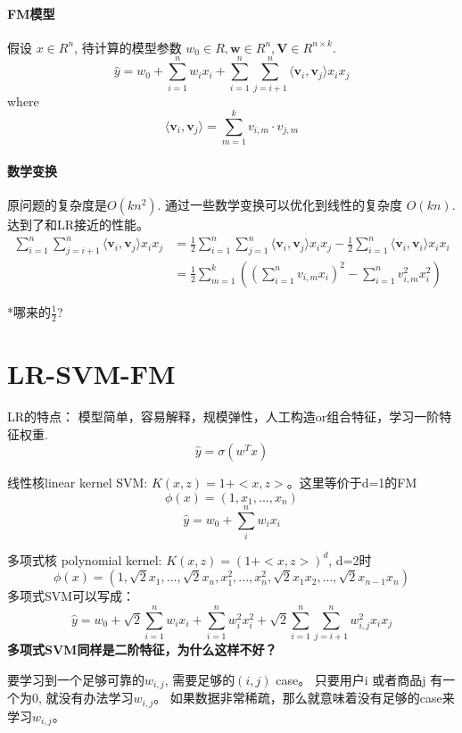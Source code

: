 \documentclass{article}
\begin{document}
\begin{CJK*}{UTF8}{gbsn}
\paragraph{FM模型} 假设 $x \in R^{n}$, 待计算的模型参数 $ w_{0} \in R, \textbf{w} \in R^{n}, \textbf{V} \in R^{n \times k}$.
$$\widehat{y}= w_{0}+\sum_{i=1}^{n}w_{i}x_{i}+\sum_{i=1}^{n}\sum_{j=i+1}^{n}\langle \textbf{v}_{i} ,\textbf{v}_{j} \rangle x_{i}x_{j}$$
where 
$$\langle \textbf{v}_{i} ,\textbf{v}_{j} \rangle =\sum_{m=1}^{k}v_{i,m} \cdot v_{j,m}$$

\paragraph{数学变换} 原问题的复杂度是$O(kn^{2})$. 通过一些数学变换可以优化到线性的复杂度 $O(kn)$. 达到了和LR接近的性能。
\begin{align*}
\sum_{i=1}^{n}\sum_{j=i+1}^{n}\langle \textbf{v}_{i} ,\textbf{v}_{j} \rangle x_{i}x_{j}
&= \frac{1}{2} \sum_{i=1}^{n}\sum_{j=1}^{n}\langle \textbf{v}_{i} ,\textbf{v}_{j} \rangle x_{i}x_{j} -\frac{1}{2}\sum_{i=1}^{n}\langle \textbf{v}_{i} ,\textbf{v}_{i} \rangle x_{i}x_{i} \\
&= \frac{1}{2}\sum_{m=1}^{k}\left( \left(\sum_{i=1}^{n}v_{i,m}x_{i}\right)^{2} -\sum_{i=1}^{n}v_{i,m}^{2}x_{i}^{2} \right)
\end{align*}

*哪来的$\frac{1}{2}$?

\section{LR-SVM-FM}
LR的特点： 模型简单，容易解释，规模弹性，人工构造or组合特征，学习一阶特征权重.
$$\widehat{y}=\sigma(w^{T}x)$$

线性核linear kernel SVM: $K(x,z)=1+<x,z>$。这里等价于d=1的FM
$$\phi(x)=(1,x_{1},...,x_{n})$$
$$\widehat{y}=w_{0}+\sum_{i}^{n}w_{i}x_{i}$$

多项式核 polynomial kernel: $K(x,z)=(1+<x,z>)^{d}$, d=2时
$$\phi(x)=(1,\sqrt{2}x_{1},...,\sqrt{2}x_{n},x_{1}^2,...,x_{n}^2,\sqrt{2}x_{1}x_{2},...,\sqrt{2}x_{n-1}x_{n})$$
多项式SVM可以写成：
$$\widehat{y}= w_{0}+\sqrt{2}\sum_{i=1}^{n}w_{i}x_{i}+\sum_{i=1}^{n}w_{i}^{2}x_{i}^{2}+\sqrt{2} \sum_{i=1}^{n}\sum_{j=i+1}^{n} w_{i,j}^{2} x_{i}x_{j}$$
\noindent
\textbf{多项式SVM同样是二阶特征，为什么这样不好？}

要学习到一个足够可靠的$w_{i,j}$, 需要足够的$(i,j)$ case。 只要用户i 或者商品j 有一个为0, 就没有办法学习$w_{i,j}$。 如果数据非常稀疏，那么就意味着没有足够的case来学习$w_{i,j}$。


\end{CJK*}
\end{document}
